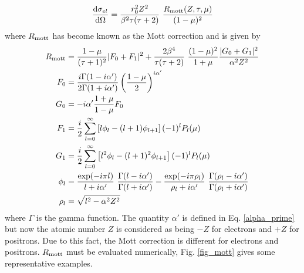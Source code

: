 \begin{equation}
{{\rm d}\sigma_{el} \over {\rm d}\Omega} = 
{r_0^2 Z^2 \over 
\beta^2 \tau (\tau + 2) }~{R_{\rm mott}(Z,\tau,\mu) \over (1 - \mu )^2} 
\end{equation}
where $R_{\rm mott}$ has become known as the Mott correction 
and is given by
\begin{equation}
\begin{split}
R_{\rm mott} & = {1 - \mu \over (\tau + 1)^2} |F_0 + F_1|^2 + 
{2 \beta^4 \over \tau (\tau + 2)}~{(1 - \mu)^2 \over 1 + \mu} 
{|G_0 + G_1|^2 \over \alpha^2 Z^2} \\ 
F_0 & = {i \Gamma(1 - i \alpha') \over 2 \Gamma(1 + i \alpha')} 
\left( {1 - \mu \over 2} \right)^{i \alpha'} \\
G_0 & = -i \alpha' {1 + \mu \over 1 - \mu} F_0 \\
F_1 & = \frac{i}{2} \sum_{l=0}^\infty \left[ l \phi_l - (l+1) \phi_{l+1}  
\right] (-1)^l P_l(\mu) \\
G_1 & = \frac{i}{2} \sum_{l=0}^\infty \left[ l^2 \phi_l - (l+1)^2 \phi_{l+1}  
\right] (-1)^l P_l(\mu) \\
\phi_l &= {\exp(-i \pi l) \over l + i \alpha'} ~ {\Gamma(l - i \alpha') 
\over \Gamma(l + i \alpha') } - {\exp(-i \pi \rho_l) \over 
\rho_l + i \alpha'}~ {\Gamma(\rho_l - i \alpha') \over 
\Gamma(\rho_l + i \alpha') } \\
\rho_l & = \sqrt{ l^2 - \alpha^2 Z^2 }
\end{split}
\end{equation}
where $\Gamma$ is the gamma function. The quantity $\alpha'$ is defined 
in Eq. \eqref{alpha_prime} but now the atomic number $Z$ is considered 
as being $-Z$ for electrons and $+Z$ for positrons. Due to 
this fact, the Mott correction is different for electrons and positrons. 
$R_{\rm mott}$ must be evaluated numerically, Fig. \ref{fig_mott} gives some 
representative examples. 
